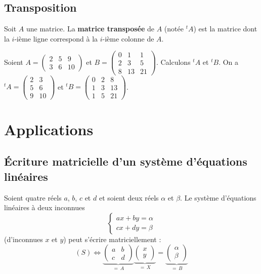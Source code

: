 	\subsection{Transposition}

	\begin{formula}[Définition]
		Soit $A$ une matrice. La \textbf{matrice transposée} de $A$ (notée $^tA$) est la matrice dont la $i$-ième ligne correspond à la $i$-ième colonne de $A$.
	\end{formula}

	\begin{tip}[Exemple]
		Soient $A = \begin{pmatrix} 2 & 5 & 9 \\ 3 & 6 & 10 \end{pmatrix}$ et $B = \begin{pmatrix} 0 & 1 & 1 \\ 2 & 3 & 5 \\ 8 & 13 & 21 \end{pmatrix}$. Calculons $^tA$ et $^tB$.
		\newpar
		On a $^tA = \begin{pmatrix} 2 & 3 \\ 5 & 6 \\ 9 & 10 \end{pmatrix}$ et $^tB = \begin{pmatrix} 0 & 2 & 8 \\ 1 & 3 & 13 \\ 1 & 5 & 21 \end{pmatrix}$.
	\end{tip}

	\section{Applications}

	\subsection{Écriture matricielle d'un système d'équations linéaires}

	\begin{formula}
		Soient quatre réels $a$, $b$, $c$ et $d$ et soient deux réels $\alpha$ et $\beta$. Le système d'équations linéaires à deux inconnues
		\[ \begin{cases}ax + by = \alpha \\ cx + dy = \beta\end{cases} \tag{S} \]
		(d'inconnues $x$ et $y$) peut s'écrire matriciellement :
		\[ (S) \iff \underbrace{\begin{pmatrix}a & b \\ c & d\end{pmatrix}}_{= \, A} \underbrace{\begin{pmatrix}x \\ y\end{pmatrix}}_{= \, X} = \underbrace{\begin{pmatrix}\alpha \\ \beta\end{pmatrix}}_{= \, B} \]
	\end{formula}

